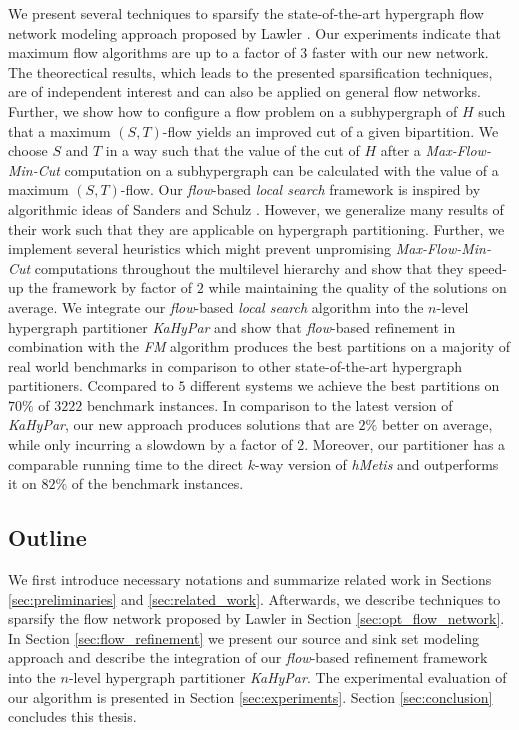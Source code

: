 We present several techniques to sparsify the state-of-the-art hypergraph flow network
modeling approach proposed by Lawler \cite{lawler1973}. Our experiments indicate that
maximum flow algorithms are up to a factor of $3$ faster with our new network. The
theorectical results, which leads to the presented sparsification techniques, are
of independent interest and can also be applied on general flow networks.
Further, we show how to configure a flow problem on a subhypergraph of $H$ such that a 
maximum $(S,T)$-flow yields an improved cut of a given bipartition. We choose $S$ and
$T$ in a way such that the value of the cut of $H$ after a \emph{Max-Flow-Min-Cut} computation on a subhypergraph 
can be calculated with the value of a maximum $(S,T)$-flow.
Our \emph{flow}-based \emph{local search} framework is inspired by algorithmic ideas of
Sanders and Schulz \cite{sanders2011engineering}. However, we generalize many results of
their work such that they are applicable on hypergraph partitioning. Further, we implement
several heuristics which might prevent unpromising \emph{Max-Flow-Min-Cut} computations 
throughout the multilevel hierarchy and show that they speed-up the framework by factor
of $2$ while maintaining the quality of the solutions on average.
We integrate our \emph{flow}-based \emph{local search} algorithm into the $n$-level hypergraph partitioner
\emph{KaHyPar} and show that \emph{flow}-based refinement in combination with the
\emph{FM} algorithm produces the best partitions on a majority of real world benchmarks
in comparison to other state-of-the-art hypergraph partitioners. 
Ccompared to $5$ different systems we achieve the best partitions on $70\%$ 
of $3222$ benchmark instances. In comparison to the 
latest version of \emph{KaHyPar}, our new approach produces solutions that are
$2\%$ better on average, while only incurring a slowdown by a factor of $2$.
Moreover, our partitioner has a comparable running time to the direct $k$-way
version of \emph{hMetis} and outperforms it on $82\%$ of the benchmark instances.

\subsection{Outline}

We first introduce necessary notations and summarize related work in Sections \ref{sec:preliminaries}
and \ref{sec:related_work}. Afterwards, we describe techniques to sparsify the flow network
proposed by Lawler \cite{lawler1973} in Section \ref{sec:opt_flow_network}. In Section
\ref{sec:flow_refinement} we present our source and sink set modeling
approach and describe the integration of our \emph{flow}-based refinement framework into
the $n$-level hypergraph partitioner \emph{KaHyPar}. The experimental evaluation of our algorithm
is presented in Section \ref{sec:experiments}. Section \ref{sec:conclusion} concludes this thesis.